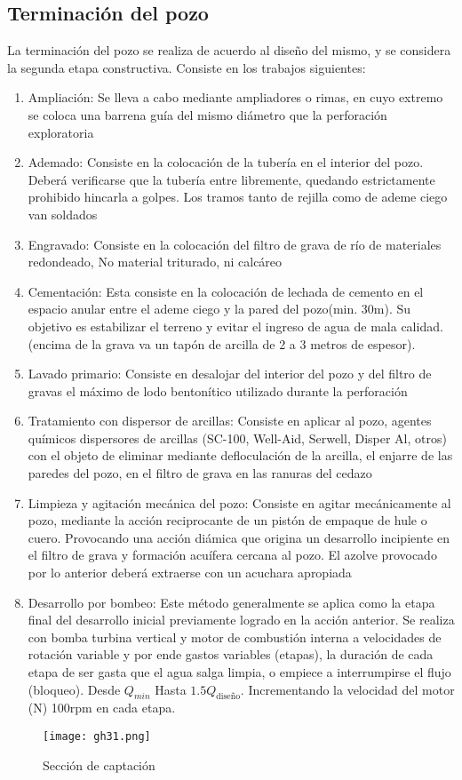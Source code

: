 \subsection{Terminación del pozo}
La terminación del pozo se realiza de acuerdo al diseño del mismo, y se considera la segunda etapa constructiva. Consiste en los trabajos siguientes:
\begin{enumerate}
    \item Ampliación: Se lleva a cabo mediante ampliadores o rimas, en cuyo extremo se coloca una barrena guía del mismo diámetro que la perforación exploratoria
    \item Ademado: Consiste en la colocación de la tubería en el interior del pozo. Deberá verificarse que la tubería entre libremente, quedando estrictamente prohibido hincarla a golpes. Los tramos tanto de rejilla como de ademe ciego van soldados
    \item Engravado: Consiste en la colocación del filtro de grava de río de materiales redondeado, No material triturado, ni calcáreo
    \item Cementación: Esta consiste en la colocación de lechada de cemento en el espacio anular entre el ademe ciego y la pared del pozo(min. 30m). Su objetivo es estabilizar el terreno y evitar el ingreso de agua de mala calidad. (encima de la grava va un tapón de arcilla de 2 a 3 metros de espesor).
    \item Lavado primario: Consiste en desalojar del interior del pozo y del filtro de gravas el máximo de lodo bentonítico utilizado durante la perforación
    \item Tratamiento con dispersor de arcillas: Consiste en aplicar al pozo, agentes químicos dispersores de arcillas (SC-100, Well-Aid, Serwell, Disper Al, otros) con el objeto de eliminar mediante defloculación de la arcilla, el enjarre de las paredes del pozo, en el filtro de grava en las ranuras del cedazo
    \item Limpieza y agitación mecánica del pozo: Consiste en agitar mecánicamente al pozo, mediante la acción reciprocante de un pistón de empaque de hule o cuero. Provocando una acción diámica que origina un desarrollo incipiente en el filtro de grava y formación acuífera cercana al pozo. El azolve provocado por lo anterior deberá extraerse con un acuchara apropiada
    \item Desarrollo por bombeo: Este método generalmente se aplica como la etapa final del desarrollo inicial previamente logrado en la acción anterior. Se realiza con bomba turbina vertical y motor de combustión interna a velocidades de rotación variable y por ende gastos variables (etapas), la duración de cada etapa de ser gasta que el agua salga limpia, o empiece a interrumpirse el flujo (bloqueo). Desde $Q_{min}$ Hasta $1.5 Q_{\text{diseño}}$. Incrementando la velocidad del motor (N) 100rpm en cada etapa.  
\end{enumerate}
\begin{figure}[h!]
\centering
  \texttt{[image: gh31.png]}
  \caption{Sección de captación}
  \label{gh31}
\end{figure}

